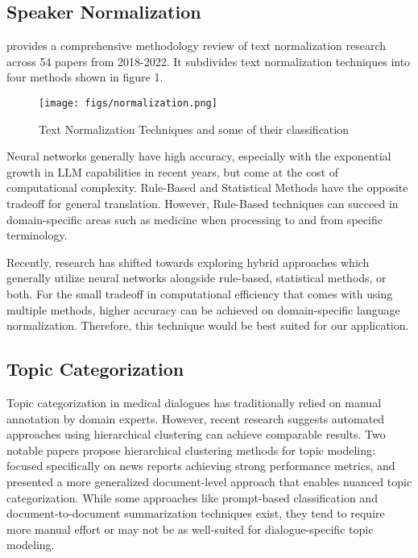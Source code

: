 \documentclass[11pt,a4paper]{article}
\begin{document}



\subsection*{Speaker Normalization}
\cite{aliero2023systematic} provides a comprehensive methodology review of text normalization research across 54 papers from 2018-2022. It subdivides text normalization techniques into four methods shown in figure 1.
\begin{figure}
    \centering
    \texttt{[image: figs/normalization.png]}
    \caption{Text Normalization Techniques and some of their classification}
    \label{fig:enter-label}
\end{figure}
Neural networks generally have high accuracy, especially with the exponential growth in LLM capabilities in recent years, but come at the cost of computational complexity. Rule-Based and Statistical Methods have the opposite tradeoff for general translation. However, Rule-Based techniques can succeed in domain-specific areas such as medicine when processing to and from specific terminology. 
\par
Recently, research has shifted towards exploring hybrid approaches which generally utilize neural networks alongside rule-based, statistical methods, or both. For the small tradeoff in computational efficiency that comes with using multiple methods, higher accuracy can be achieved on domain-specific language normalization. Therefore, this technique would be best suited for our application.


\subsection*{Topic Categorization}
Topic categorization in medical dialogues has traditionally relied on manual annotation by domain experts. 
However, recent research suggests automated approaches using hierarchical clustering can achieve comparable results. 
Two notable papers propose hierarchical clustering methods for topic modeling: \cite{kapoor2024qualitativeinsightstoolqualit} focused specifically on news reports achieving strong performance metrics, and \cite{khandelwal2025usingllmbasedapproachesenhance} presented a more generalized document-level approach that enables nuanced topic categorization.
While some approaches like prompt-based classification and document-to-document summarization techniques exist, they tend to require more manual effort or may not be as well-suited for dialogue-specific topic modeling.
\end{document}
